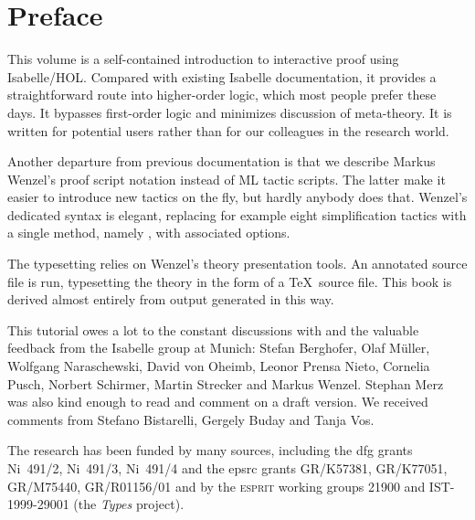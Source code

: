 \chapter*{Preface}

This volume is a self-contained introduction to interactive proof using
Isabelle/HOL\@.  Compared with existing Isabelle documentation, it
provides a straightforward route into higher-order logic, which most
people prefer these days. It bypasses first-order logic and minimizes
discussion of meta-theory.  It is written for potential users rather
than for our colleagues in the research world.

%
Another departure from previous documentation is that we describe Markus
Wenzel's proof script notation instead of ML tactic scripts.  The latter
make it easier to introduce new tactics on the fly, but hardly anybody
does that.  Wenzel's dedicated syntax is elegant, replacing for example
eight simplification tactics with a single method, namely ,
with associated options.

The typesetting relies on Wenzel's theory presentation tools.  An
annotated source file is run, typesetting the theory
in the form of a \TeX\ source file.  This book is
derived almost entirely from output generated in this way.

This tutorial owes a lot to the constant discussions with and the valuable
feedback from the Isabelle group at Munich: Stefan Berghofer, Olaf
M{\"u}ller, Wolfgang Naraschewski, David von Oheimb, Leonor Prensa Nieto,
Cornelia Pusch, Norbert Schirmer, Martin Strecker and Markus Wenzel. Stephan
Merz was also kind enough to read and comment on a draft version.  We
received comments from Stefano Bistarelli, Gergely Buday and Tanja
Vos.

The research has been funded by many sources, including the {\sc dfg} grants
Ni~491/2, Ni~491/3, Ni~491/4 and the {\sc epsrc} grants GR\slash K57381,
GR\slash K77051, GR\slash M75440, GR\slash R01156\slash 01 and by the
\textsc{esprit} working groups 21900 and IST-1999-29001 (the \emph{Types}
project).


